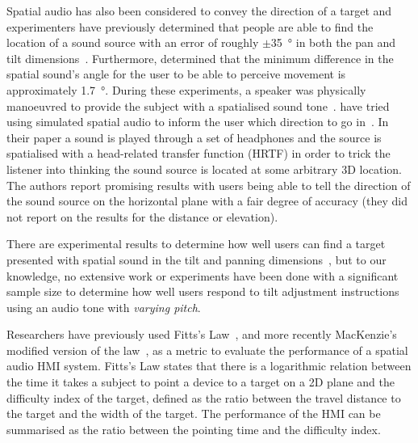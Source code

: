\documentclass[format=sigconf, review=true, screen=true, anonymous=true]{acmart}
\begin{document}
Spatial audio has also been considered to convey the direction of a target and experimenters have previously determined that people are able to find the location of a sound source with an error of roughly $\pm$\SI{35}{\degree} in both the pan and tilt dimensions~\cite{zwiers2001spatial}. Furthermore, \citeauthor{ashmead1998spatial} determined that the minimum difference in the spatial sound's angle for the user to be able to perceive movement is approximately \SI{1.7}{\degree}. During these experiments, a speaker was physically manoeuvred to provide the subject with a spatialised sound tone~\cite{ashmead1998spatial}. \citeauthor{holland2002audiogps} have tried using simulated spatial audio to inform the user which direction to go in~\cite{holland2002audiogps}. In their paper a sound is played through a set of headphones and the source is spatialised with a head-related transfer function (HRTF) in order to trick the listener into thinking the sound source is located at some arbitrary 3D location. The authors report promising results with users being able to tell the direction of the sound source on the horizontal plane with a fair degree of accuracy (they did not report on the results for the distance or elevation). %

There are experimental results to determine how well users can find a target presented with spatial sound in the tilt and panning dimensions~\cite{katz2011spatial, zwiers2001spatial}, but to our knowledge, no extensive work or experiments have been done with a significant sample size to determine how well users respond to tilt adjustment instructions using an audio tone with \emph{varying pitch}. %

Researchers have previously used Fitts's Law~\cite{fitts1954information}, and more recently MacKenzie's modified version of the law~\cite{mackenzie1992fitts}, as a metric to evaluate the performance of a spatial audio HMI system. Fitts's Law states that there is a logarithmic relation between the time it takes a subject to point a device to a target on a 2D plane and the difficulty index of the target, defined as the ratio between the travel distance to the target and the width of the target. The performance of the HMI can be summarised as the ratio between the pointing time and the difficulty index. 
\end{document}
